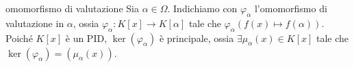 \begin{minipage}{0.7\textwidth}
\begin{definition}{omomorfismo di valutazione}
    Sia $\alpha \in \Omega$. Indichiamo con $\varphi_{\alpha}$ l'omomorfismo di valutazione in $\alpha$, ossia $\varphi_{\alpha}: K[x] \rightarrow K[\alpha]$ tale che $\varphi_{\alpha}(f(x) \mapsto f(\alpha))$. Poiché $K[x]$ è un PID, $\ker(\varphi_\alpha)$ è principale, ossia $\exists \mu_{\alpha}(x) \in K[x]$ tale che $\ker(\varphi_\alpha) = (\mu_\alpha(x))$.
\end{definition}
\end{minipage}\hfill
\begin{minipage}{0.3\textwidth}  
    \begin{center}
    \end{center}
\end{minipage}\hfill


